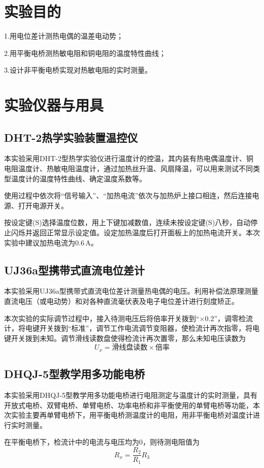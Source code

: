 \documentclass[UTF-8,twoside,cs4size]{ctexart}
\begin{document}
	\section{实验目的}
	1.用电位差计测热电偶的温差电动势；
	
	2.用平衡电桥测热敏电阻和铜电阻的温度特性曲线；
	
	3.设计非平衡电桥实现对热敏电阻的实时测量。
	
	\section{实验仪器与用具}
	\subsection{DHT-2热学实验装置温控仪}
	本实验采用DHT-2型热学实验仪进行温度计的控温，其内装有热电偶温度计、铜电阻温度计、热敏电阻温度计，通过加热丝升温、风扇降温，可以用来测试不同类型温度计的温度特性曲线、确定温度系数等。
	
	使用过程中依次将“信号输入”、“加热电流”依次与加热炉上接口相连，然后连接电源、打开电源开关。
	
	按设定键(S)选择温度位数，用上下键加减数值，连续未按设定键(S)八秒，自动停止闪烁并返回正常显示设定值。设定加热温度后打开面板上的加热电流开关。本次实验中建议加热电流为$ 0.6\,\mathrm A $。
	\subsection{UJ36a型携带式直流电位差计}
	本实验采用UJ36a型携带式直流电位差计测量热电偶的电压。利用补偿法原理测量直流电压（或电动势）和对各种直流毫伏表及电子电位差计进行刻度矫正。
	
	本次实验的实际调节过程中，接入待测电压后将倍率开关拨到“$ \times 0.2 $”，调零检流计，将电键开关拨到“标准”，调节工作电流调节变阻器，使检流计再次指零，将电键开关拨到未知。调节滑线读数盘使得检流计再次置零，那么未知电压读数为
	\[U_x=\text{滑线盘读数}\times\text{倍率}\]
	\subsection{DHQJ-5型教学用多功能电桥}
	本实验采用DHQJ-5型教学用多功能电桥进行电阻测定与温度计的实时测量，具有开放式电桥、双臂电桥、单臂电桥、功率电桥和非平衡使用的单臂电桥等功能，本次实验主要再单臂电桥下，用平衡电桥测温度计的电阻，用非平衡电桥对温度计进行实时测量。
	
	在平衡电桥下，检流计中的电流与电压均为0，则待测电阻值为
	\[R_x=\frac{R_2}{R_1}R_3\]
	
\end{document}
